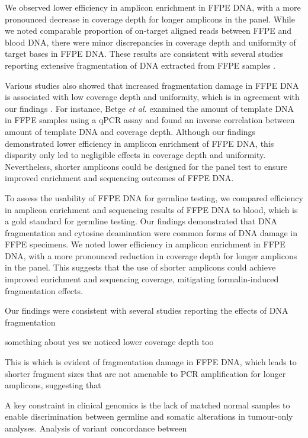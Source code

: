 We observed lower efficiency in amplicon enrichment in FFPE DNA, with a more pronounced decrease in coverage depth for longer amplicons in the panel. While we noted comparable proportion of on-target aligned reads between FFPE and blood DNA, there were minor discrepancies in coverage depth and uniformity of target bases in FFPE DNA. These results are consistent with several studies reporting extensive fragmentation of DNA extracted from FFPE samples \cite{Wong2014, Didelot2013, Oh2015, Wong2013, Betge2015, Spencer2013}.

Various studies also showed that increased fragmentation damage in FFPE DNA is associated with low coverage depth and uniformity, which is in agreement with our findings \cite{Wong2013, Wong2014, Didelot2013, Betge2015, Spencer2013}. For instance, Betge \textit{et al.}\cite{Betge2015} examined the amount of template DNA in FFPE samples using a qPCR assay and found an inverse correlation between amount of template DNA and coverage depth. Although our findings demonstrated lower efficiency in amplicon enrichment of FFPE DNA, this disparity only led to negligible effects in coverage depth and uniformity. Nevertheless, shorter amplicons could be designed for the panel test to ensure improved enrichment and sequencing outcomes of FFPE DNA.

To assess the usability of FFPE DNA for germline testing, we compared efficiency in amplicon enrichment and sequencing results of FFPE DNA to blood, which is a gold standard for germline testing. Our findings demonstrated that DNA fragmentation and cytosine deamination were common forms of DNA damage in FFPE specimens. We noted lower efficiency in amplicon enrichment in FFPE DNA, with a more pronounced reduction in coverage depth for longer amplicons in the panel. This suggests that the use of shorter amplicons could achieve improved enrichment and sequencing coverage, mitigating formalin-induced fragmentation effects.

Our findings were consistent with several studies reporting the effects of DNA fragmentation

something about yes we noticed lower coverage depth too

This is which is evident of fragmentation damage in FFPE DNA, which leads to shorter fragment sizes that are not amenable to PCR amplification for longer amplicons, suggesting that

A key constraint in clinical genomics is the lack of matched normal samples to enable discrimination between germline and somatic alterations in tumour-only analyses. Analysis of variant concordance between



